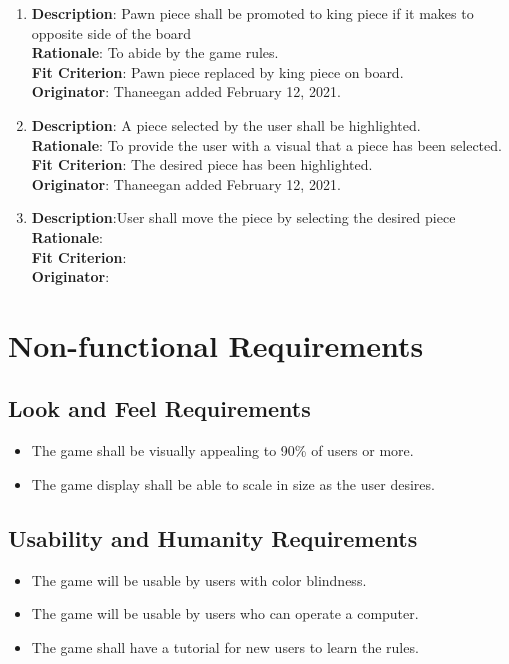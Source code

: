 \documentclass[12pt, titlepage]{article}
\begin{document}
\begin{enumerate}[{FR}1.]
    \item\textbf{Description}: Pawn piece shall be promoted to king piece if it makes to opposite side of the board\\
        \textbf{Rationale}: To abide by the game rules.\\
        \textbf{Fit Criterion}: Pawn piece replaced by king piece on board. \\
        \textbf{Originator}: Thaneegan added February 12, 2021.
        
    \item\textbf{Description}: A piece selected by the user shall be highlighted.\\
        \textbf{Rationale}: To provide the user with a visual that a piece has been selected.\\
        \textbf{Fit Criterion}: The desired piece has been highlighted. \\
        \textbf{Originator}: Thaneegan added February 12, 2021.

    \item\textbf{Description}:User shall move the piece by selecting the desired piece\\
        \textbf{Rationale}: \\
        \textbf{Fit Criterion}: \\
        \textbf{Originator}:  
        
\end{enumerate}

\section{Non-functional Requirements}

\subsection{Look and Feel Requirements}
\begin{itemize}
    \item The game shall be visually appealing to 90\% of users or more.
    \item The game display shall be able to scale in size as the user desires.
\end{itemize}

\subsection{Usability and Humanity Requirements}
\begin{itemize}
    \item The game will be usable by users with color blindness.
    \item The game will be usable by users who can operate a computer.
    \item The game shall have a tutorial for new users to learn the rules.
\end{itemize}
\end{document}
